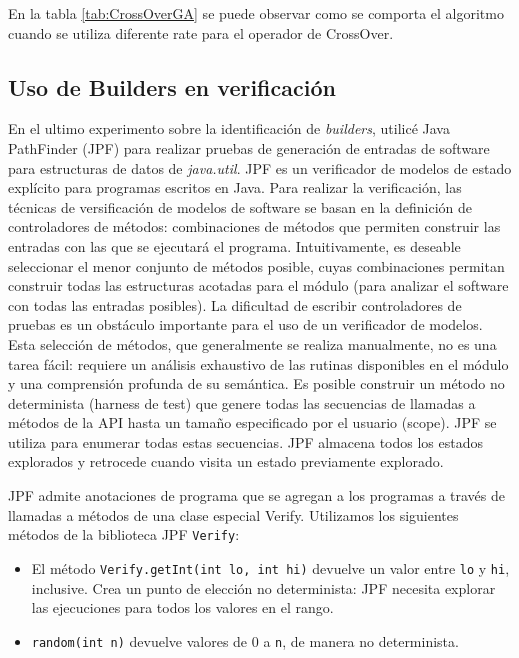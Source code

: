 En la tabla \ref{tab:CrossOverGA} se puede observar como se comporta el algoritmo cuando se utiliza diferente rate para el operador de CrossOver. 





% 

\subsection{Uso de Builders en verificación}

En el ultimo experimento sobre la identificación de \emph{builders}, utilicé Java PathFinder \cite{Visser:2005} (JPF) para realizar pruebas de generación de entradas de software para estructuras de datos de \emph{java.util}. JPF  es un verificador de modelos de estado explícito para programas escritos en Java. Para realizar la verificación, las técnicas de versificación de modelos de software se basan en la definición de controladores de métodos: combinaciones de métodos que permiten construir las entradas con las que se ejecutará el programa. Intuitivamente, es deseable seleccionar el menor conjunto de métodos posible, cuyas combinaciones permitan construir todas las estructuras acotadas para el módulo (para analizar el software con todas las entradas posibles). La dificultad de escribir controladores de pruebas es un obstáculo importante para el uso de un verificador de modelos. Esta selección de métodos, que generalmente se realiza manualmente, no es una tarea fácil: requiere un análisis exhaustivo de las rutinas disponibles en el módulo y una comprensión profunda de su semántica.
Es posible construir un método no determinista (harness de test) que genere todas las secuencias de llamadas a métodos de la API hasta un tamaño especificado por el usuario (scope). JPF se utiliza para enumerar todas estas secuencias. JPF almacena todos los estados explorados y retrocede cuando visita un estado previamente explorado.

JPF admite anotaciones de programa que se agregan a los programas a través de llamadas a métodos de una clase especial Verify.
Utilizamos los siguientes métodos de la biblioteca JPF \verb"Verify":
\\
\begin{itemize}
\item El método \verb"Verify.getInt(int lo, int hi)" devuelve un valor entre \verb"lo" y \verb"hi", inclusive. Crea un punto de elección no determinista: JPF necesita explorar las ejecuciones para todos los valores en el rango.
\item \verb"random(int n)" devuelve valores de 0 a \verb"n", de manera no determinista.
\end{itemize}

